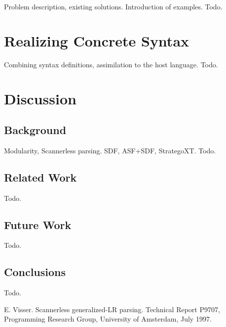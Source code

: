 \documentclass[a4paper,11pt]{article}
\begin{document}
Problem description, existing solutions.
Introduction of examples.
Todo.


\section{Realizing Concrete Syntax}

Combining syntax definitions, assimilation to the host language.
Todo.


\section{Discussion}


\subsection{Background}

Modularity, Scannerless parsing.
SDF, ASF+SDF, StrategoXT.
Todo.


\subsection{Related Work}

Todo.


\subsection{Future Work}

Todo.


\subsection{Conclusions}

Todo.


\begin{thebibliography}{99}

E. Visser. Scannerless generalized-LR parsing.
Technical Report P9707, Programming Research Group, University of Amsterdam, July 1997.

\end{thebibliography}
\end{document}
